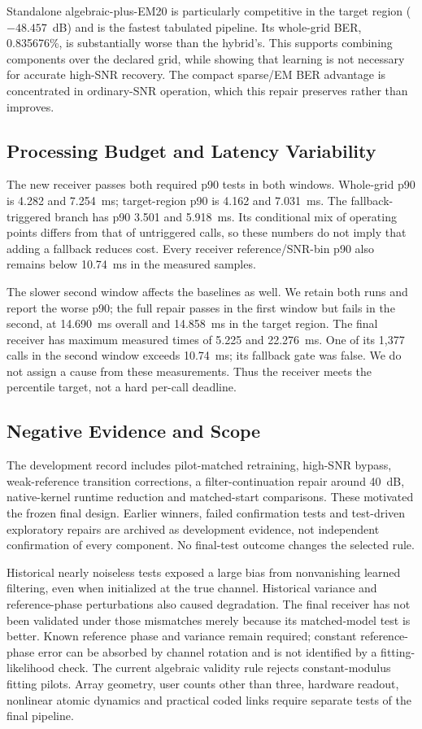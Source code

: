 Standalone algebraic-plus-EM20 is particularly competitive in the target region ($-48.457$~dB) and is the fastest tabulated pipeline. Its whole-grid BER, 0.835676\%, is substantially worse than the hybrid's. This supports combining components over the declared grid, while showing that learning is not necessary for accurate high-SNR recovery. The compact sparse/EM BER advantage is concentrated in ordinary-SNR operation, which this repair preserves rather than improves.

\subsection{Processing Budget and Latency Variability}
The new receiver passes both required p90 tests in both windows. Whole-grid p90 is 4.282 and 7.254~ms; target-region p90 is 4.162 and 7.031~ms. The fallback-triggered branch has p90 3.501 and 5.918~ms. Its conditional mix of operating points differs from that of untriggered calls, so these numbers do not imply that adding a fallback reduces cost. Every receiver reference/SNR-bin p90 also remains below 10.74~ms in the measured samples.

The slower second window affects the baselines as well. We retain both runs and report the worse p90; the full repair passes in the first window but fails in the second, at 14.690~ms overall and 14.858~ms in the target region. The final receiver has maximum measured times of 5.225 and 22.276~ms. One of its 1,377 calls in the second window exceeds 10.74~ms; its fallback gate was false. We do not assign a cause from these measurements. Thus the receiver meets the percentile target, not a hard per-call deadline.

\subsection{Negative Evidence and Scope}
The development record includes pilot-matched retraining, high-SNR bypass, weak-reference transition corrections, a filter-continuation repair around 40~dB, native-kernel runtime reduction and matched-start comparisons. These motivated the frozen final design. Earlier winners, failed confirmation tests and test-driven exploratory repairs are archived as development evidence, not independent confirmation of every component. No final-test outcome changes the selected rule.

Historical nearly noiseless tests exposed a large bias from nonvanishing learned filtering, even when initialized at the true channel. Historical variance and reference-phase perturbations also caused degradation. The final receiver has not been validated under those mismatches merely because its matched-model test is better. Known reference phase and variance remain required; constant reference-phase error can be absorbed by channel rotation and is not identified by a fitting-likelihood check. The current algebraic validity rule rejects constant-modulus fitting pilots. Array geometry, user counts other than three, hardware readout, nonlinear atomic dynamics and practical coded links require separate tests of the final pipeline.
